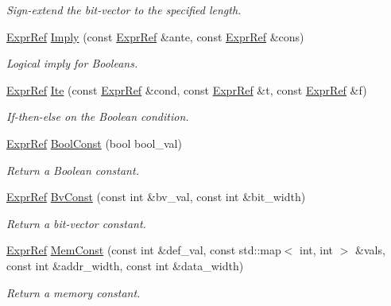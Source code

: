 \begin{DoxyCompactItemize}
\begin{DoxyCompactList}\small\item\em Sign-\/extend the bit-\/vector to the specified length. \end{DoxyCompactList}\item 
\mbox{\hyperlink{classilang_1_1_expr_ref}{Expr\+Ref}} \mbox{\hyperlink{namespaceilang_a717385221eb8322e7b19096ba48d2516}{Imply}} (const \mbox{\hyperlink{classilang_1_1_expr_ref}{Expr\+Ref}} \&ante, const \mbox{\hyperlink{classilang_1_1_expr_ref}{Expr\+Ref}} \&cons)
\begin{DoxyCompactList}\small\item\em Logical imply for Booleans. \end{DoxyCompactList}\item 
\mbox{\hyperlink{classilang_1_1_expr_ref}{Expr\+Ref}} \mbox{\hyperlink{namespaceilang_ab63ed74adc72075df524ec933146f0f3}{Ite}} (const \mbox{\hyperlink{classilang_1_1_expr_ref}{Expr\+Ref}} \&cond, const \mbox{\hyperlink{classilang_1_1_expr_ref}{Expr\+Ref}} \&t, const \mbox{\hyperlink{classilang_1_1_expr_ref}{Expr\+Ref}} \&f)
\begin{DoxyCompactList}\small\item\em If-\/then-\/else on the Boolean condition. \end{DoxyCompactList}\item 
\mbox{\hyperlink{classilang_1_1_expr_ref}{Expr\+Ref}} \mbox{\hyperlink{namespaceilang_a41b370cb62e6bb2a4abba9b9f482ff6f}{Bool\+Const}} (bool bool\+\_\+val)
\begin{DoxyCompactList}\small\item\em Return a Boolean constant. \end{DoxyCompactList}\item 
\mbox{\hyperlink{classilang_1_1_expr_ref}{Expr\+Ref}} \mbox{\hyperlink{namespaceilang_a2c81eb12aece5b37849917b2dee95695}{Bv\+Const}} (const int \&bv\+\_\+val, const int \&bit\+\_\+width)
\begin{DoxyCompactList}\small\item\em Return a bit-\/vector constant. \end{DoxyCompactList}\item 
\mbox{\hyperlink{classilang_1_1_expr_ref}{Expr\+Ref}} \mbox{\hyperlink{namespaceilang_a4aabcae2083096742642384a583eb06f}{Mem\+Const}} (const int \&def\+\_\+val, const std\+::map$<$ int, int $>$ \&vals, const int \&addr\+\_\+width, const int \&data\+\_\+width)
\begin{DoxyCompactList}\small\item\em Return a memory constant. \end{DoxyCompactList}\item 

\end{DoxyCompactItemize}
